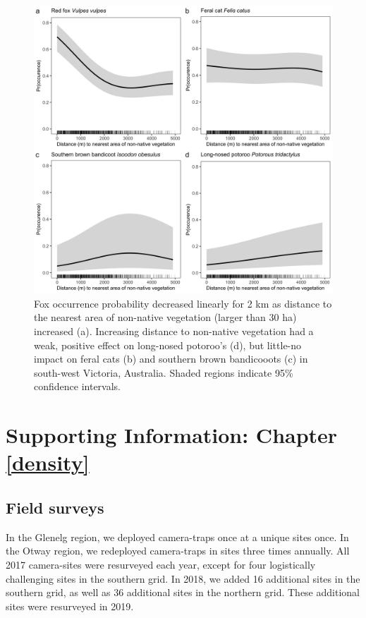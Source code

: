 \documentclass[11pt,a4paper,titlepage,twoside,openright]{style/unimelbthesis}
\begin{document}
\begin{mainmatter}
\begin{figure}
{\centering \includegraphics[width=1\linewidth]{figure/dist_edge} 

}

\caption{Fox occurrence probability decreased linearly for 2 km as distance to the nearest area of non-native vegetation (larger than 30 ha) increased (a). Increasing distance to non-native vegetation had a weak, positive effect on long-nosed potoroo's (d), but little-no impact on feral cats (b) and southern brown bandicooots (c) in south-west Victoria, Australia. Shaded regions indicate 95\% confidence intervals.}\label{fig:occ-dist}
\end{figure}
\newpage

\hypertarget{density-app}{%
\chapter{Supporting Information: Chapter \ref{density}}\label{density-app}}

\newpage

\hypertarget{density-app-field}{%
\section{Field surveys}\label{density-app-field}}

In the Glenelg region, we deployed camera-traps once at a unique sites once. In the Otway region, we redeployed camera-traps in sites three times annually. All 2017 camera-sites were resurveyed each year, except for four logistically challenging sites in the southern grid. In 2018, we added 16 additional sites in the southern grid, as well as 36 additional sites in the northern grid. These additional sites were resurveyed in 2019.


\end{mainmatter}
\end{document}
